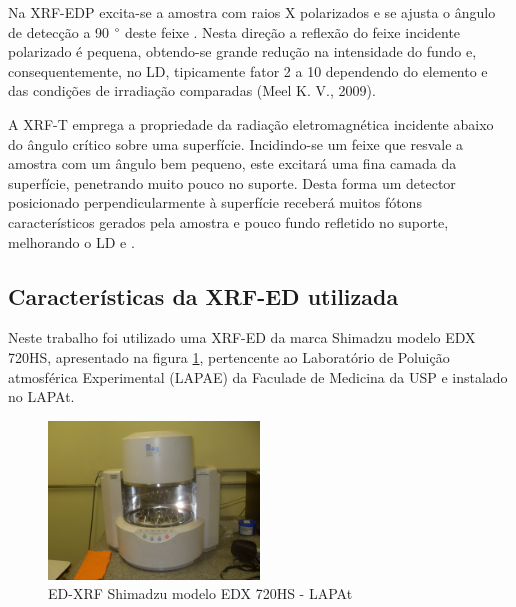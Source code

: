 Na XRF-EDP excita-se a amostra com raios X polarizados e se ajusta o ângulo 
de detecção a 90 $\degree$ deste feixe \cite{dzubay1974}. Nesta direção a 
reflexão do feixe incidente polarizado é pequena, obtendo-se grande redução 
na intensidade do fundo e, consequentemente, no LD, tipicamente fator 2 a 10
dependendo do elemento e das condições de irradiação comparadas 
(Meel K. V., 2009).


A XRF-T emprega a propriedade da radiação eletromagnética incidente abaixo do
ângulo crítico sobre uma superfície. Incidindo-se um feixe que resvale a amostra
com um ângulo bem pequeno, este excitará uma fina camada da superfície, 
penetrando muito pouco no suporte. Desta forma um detector posicionado 
perpendicularmente à superfície receberá muitos fótons característicos gerados 
pela amostra e pouco fundo refletido no suporte, melhorando o LD
\citep{yoneda1971} e \citep{aiginger1974}.

\subsection{Características da XRF-ED utilizada}

Neste trabalho foi utilizado uma XRF-ED da marca Shimadzu modelo EDX 720HS, 
apresentado na figura \ref{fig:xrfed_iag},
pertencente ao Laboratório de Poluição atmosférica Experimental (LAPAE) 
da Faculade de Medicina da USP e instalado no LAPAt. 

\begin{figure}[H]
  \centering
  \includegraphics[width=0.5\textwidth]{../inputs/images/xrf-ed-IAG-USP.jpg}
  \caption{ED-XRF Shimadzu modelo EDX 720HS - LAPAt \label{fig:xrfed_iag}}
\end{figure}

